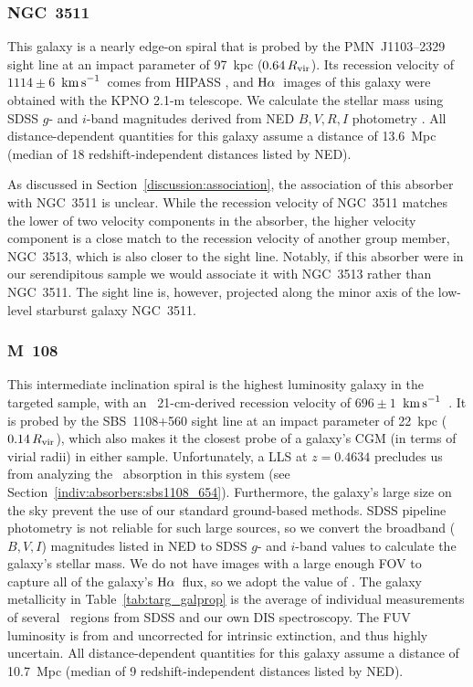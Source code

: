 \documentclass[twocolumn,twocolappendix,tighten,times]{aastex6}
\newcommand{\HI}{\ion{H}{1}}
\newcommand{\HII}{\ion{H}{2}}
\newcommand{\Ha}{\ensuremath{{\rm H}\alpha}}
\newcommand{\kms}{\ensuremath{{\rm km\,s}^{-1}}}
\begin{document}
\subsubsection{NGC~3511}
\label{indiv:galaxies:ngc3511}

This galaxy is a nearly edge-on spiral that is probed by
the  PMN~J1103--2329 sight line at an impact parameter of 97~kpc
($0.64\,R_{\rm vir}$).  Its recession velocity of $1114\pm6$~\kms\
comes from HIPASS \citep{meyer04}, and \Ha\ images of this galaxy were
obtained with the KPNO 2.1-m telescope. We calculate the stellar mass
using SDSS $g$- and $i$-band magnitudes derived from NED $B,V,R,I$
photometry \citep{jester05}. All distance-dependent quantities for
this galaxy assume a distance of 13.6~Mpc (median of 18
redshift-independent distances listed by NED).

As discussed in Section~\ref{discussion:association}, the association
of this absorber with NGC~3511 is unclear. While the recession velocity of 
NGC~3511 matches the lower of two velocity components in the absorber, the 
higher velocity component is a close match to the recession velocity of 
another group member, NGC~3513, which is also closer to the sight line.
Notably, if this absorber were in our serendipitous sample we would 
associate it with NGC~3513 rather than NGC~3511. The sight line is, however, 
projected along the minor axis of the low-level starburst galaxy NGC~3511.


\subsubsection{M~108}
\label{indiv:galaxies:m108}

This intermediate inclination spiral is the highest luminosity galaxy in the
targeted sample,  with an \HI\ 21-cm-derived recession velocity of
$696\pm1$~\kms\ \citep{springob05}.  It is probed by the SBS~1108+560
sight line at an impact parameter of 22~kpc  ($0.14\,R_{\rm vir}$),
which also makes it the closest probe of a galaxy's CGM  (in terms of
virial radii) in either sample. Unfortunately, a LLS at $z=0.4634$
precludes us from analyzing the \HI\ absorption in this system (see
Section~\ref{indiv:absorbers:sbs1108_654}). Furthermore, the galaxy's 
large size on the sky prevent the use of our standard ground-based methods. 
SDSS pipeline photometry is not reliable for such large sources, so we convert 
the broadband ($B,V,I$) magnitudes listed in NED to SDSS $g$- and $i$-band values 
\citep{jester05} to calculate the galaxy's stellar mass. We do not have images 
with a large enough FOV to capture all of the galaxy's \Ha\ flux, so we adopt 
the value of \citet{kennicutt08}.  The galaxy metallicity in
Table~\ref{tab:targ_galprop} is the average of individual
measurements of several \HII\ regions from SDSS and our own DIS
spectroscopy.  The FUV luminosity is from \citet*{rifatto95} and 
uncorrected for intrinsic extinction, and thus highly uncertain.
All distance-dependent quantities for this galaxy assume a distance of 
10.7~Mpc  (median of 9 redshift-independent distances listed by NED).
\end{document}
